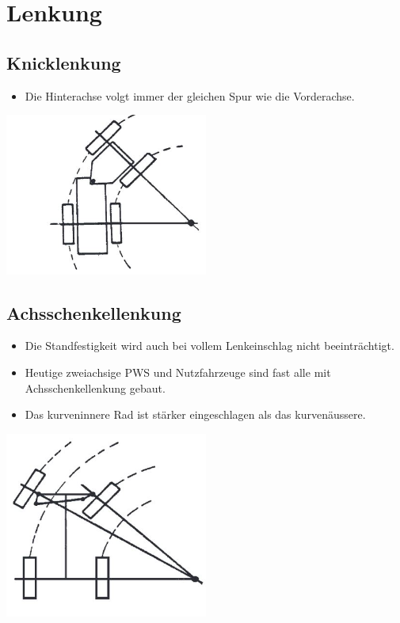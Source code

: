 \section{Lenkung}
\subsection{Knicklenkung}
\begin{itemize}
\item Die Hinterachse volgt immer der gleichen Spur wie die Vorderachse.\\
\end{itemize}
\includegraphics[width=0.5\textwidth]{Images/Knicklenkung.JPG}
\subsection{Achsschenkellenkung}
\begin{itemize}	
\item Die Standfestigkeit wird auch bei vollem Lenkeinschlag nicht beeinträchtigt.\\
\item Heutige zweiachsige PWS und Nutzfahrzeuge sind fast alle mit Achsschenkellenkung gebaut.\\
\item Das kurveninnere Rad ist stärker eingeschlagen als das kurvenäussere.\\
\end{itemize}
\includegraphics[width=0.5\textwidth]{Images/Achsschellenlenkung.JPG}
